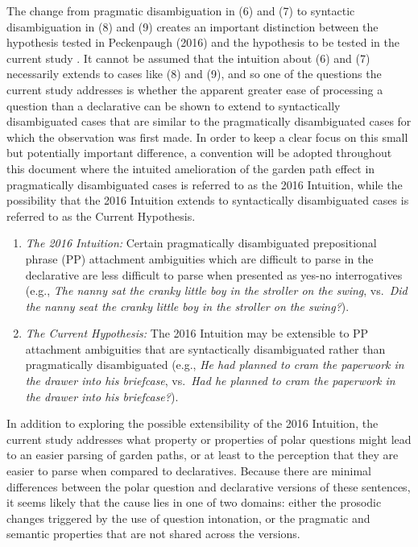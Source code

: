 \documentclass[12pt,oneside]{book}
\begin{document}
The change from pragmatic disambiguation in (6) and (7) to syntactic disambiguation in (8) and (9) creates an important distinction between the hypothesis tested in Peckenpaugh (2016) and the hypothesis to be tested in the current study . It cannot be assumed that the intuition about (6) and (7) necessarily extends to cases like (8) and (9), and so one of the questions the current study addresses is whether the apparent greater ease of processing a question than a declarative can be shown to extend to syntactically disambiguated cases that are similar to the pragmatically disambiguated cases for which the observation was first made. In order to keep a clear focus on this small but potentially important difference, a convention will be adopted throughout this document where the intuited amelioration of the garden path effect in pragmatically disambiguated cases is referred to as the 2016 Intuition, while the possibility that the 2016 Intuition extends to syntactically disambiguated cases is referred to as the Current Hypothesis.

\begin{enumerate}
\def\labelenumi{(\arabic{enumi})}
\setcounter{enumi}{9}
\item
  \emph{The 2016 Intuition:} Certain pragmatically disambiguated prepositional phrase (PP) attachment ambiguities which are difficult to parse in the declarative are less difficult to parse when presented as yes-no interrogatives (e.g., \emph{The nanny sat the cranky little boy in the stroller on the swing}, vs.~\emph{Did the nanny seat the cranky little boy in the stroller on the swing?}).
\item
  \emph{The Current Hypothesis:} The 2016 Intuition may be extensible to PP attachment ambiguities that are syntactically disambiguated rather than pragmatically disambiguated (e.g., \emph{He had planned to cram the paperwork in the drawer into his briefcase}, vs.~\emph{Had he planned to cram the paperwork in the drawer into his briefcase?}).
\end{enumerate}

In addition to exploring the possible extensibility of the 2016 Intuition, the current study addresses what property or properties of polar questions might lead to an easier parsing of garden paths, or at least to the perception that they are easier to parse when compared to declaratives. Because there are minimal differences between the polar question and declarative versions of these sentences, it seems likely that the cause lies in one of two domains: either the prosodic changes triggered by the use of question intonation, or the pragmatic and semantic properties that are not shared across the versions.
\end{document}
